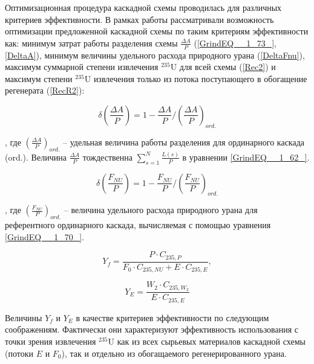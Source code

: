Оптимизационная процедура каскадной схемы проводилась для различных критериев эффективности. В рамках работы рассматривали возможность оптимизации предложенной каскадной схемы по таким критериям эффективности как: минимум затрат работы разделения схемы $\frac{\Delta A}{P}$ (\ref{GrindEQ__1_73_}, \ref{DeltaA}), минимум величины удельного расхода природного урана (\ref{DeltaFnu}), максимум суммарной степени извлечения $^{235}$U для всей схемы (\ref{Rec2}) и максимум степени $^{235}$U извлечения только из потока поступающего в обогащение регенерата (\ref{RecR2}):

\begin{equation} \label{DeltaA} 
    \delta(\frac{\Delta A}{P})=1-\frac{\Delta A}{P}/(\frac{\Delta A}{P})_{ord.}
\end{equation}

, где $(\frac{\Delta A}{P})_{ord.}$ -- удельная величина работы разделения для ординарного каскада (ord.). Величина $\frac{\Delta A}{P}$ тождественна $\sum _{s=1}^{N}\frac{L(s)}{P}$ в уравнении \ref{GrindEQ__1_62_}.

\begin{equation} \label{DeltaFnu} 
\delta(\frac{F_{NU}}{P})=1-\frac{F_{NU}}{P}/(\frac{F_{NU}}{P})_{ord.}
\end{equation} 

, где $(\frac{F_{NU}}{P})_{ord.}$ -- величина удельного расхода природного урана для референтного ординарного каскада, вычисляемая с помощью уравнения \ref{GrindEQ__1_70_}.

\begin{equation} \label{Rec2} 
    Y_f = \frac{P \cdot C_{235,P}}{F_0 \cdot C_{235,NU} + E \cdot C_{235,E}}, 
\end{equation} 

\begin{equation} \label{RecR2} 
    Y_{E} = \frac{W_2\cdot C_{235,W_2}}{E \cdot C_{235,E}}        
\end{equation} 

Величины $Y_f$ и $Y_{E}$ в качестве критериев эффективности по следующим соображениям. Фактически они характеризуют эффективность использования с точки зрения извлечения $^{235}$U как из всех сырьевых материалов каскадной схемы (потоки $E$ и $F_0$), так и отдельно из обогащаемого регенерированного урана.

